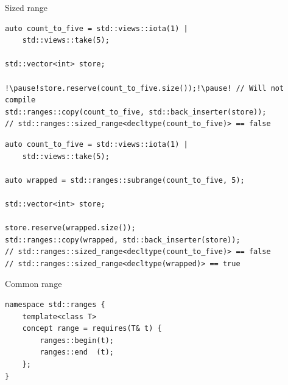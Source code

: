 \documentclass[aspectratio=169]{beamer}
\begin{document}
\begin{frame}[c]
    \Huge
    \begin{center}
        Sized range
    \end{center}
\end{frame}

\begin{frame}[fragile,c]
\large
\begin{center}
\begin{verbatim}
auto count_to_five = std::views::iota(1) |
    std::views::take(5);

std::vector<int> store;

!\pause!store.reserve(count_to_five.size());!\pause! // Will not compile
std::ranges::copy(count_to_five, std::back_inserter(store));
// std::ranges::sized_range<decltype(count_to_five)> == false
\end{verbatim}
\end{center}
\let\thefootnote\relax{}
\end{frame}

\begin{frame}[fragile,c]
\large
\begin{center}
\begin{verbatim}
auto count_to_five = std::views::iota(1) | 
    std::views::take(5);

auto wrapped = std::ranges::subrange(count_to_five, 5);

std::vector<int> store;

store.reserve(wrapped.size());
std::ranges::copy(wrapped, std::back_inserter(store));
// std::ranges::sized_range<decltype(count_to_five)> == false
// std::ranges::sized_range<decltype(wrapped)> == true
\end{verbatim}
\end{center}
\let\thefootnote\relax{}
\end{frame}

\begin{frame}[c]
    \Huge
    \begin{center}
        Common range
    \end{center}
\end{frame}

\begin{frame}[fragile,c]
\Large
\begin{center}
\begin{verbatim}
namespace std::ranges {
    template<class T>
    concept range = requires(T& t) {
        ranges::begin(t);
        ranges::end  (t);
    };
}
\end{verbatim}
\end{center}
\end{frame}
\end{document}
